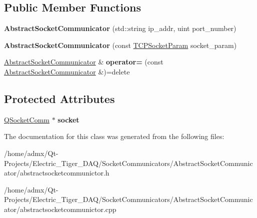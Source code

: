 \subsection*{Public Member Functions}
\begin{DoxyCompactItemize}
\item 
\hypertarget{class_abstract_socket_communicator_a94b6e0b544fadba42bd3a5c6f4a549fd}{{\bfseries Abstract\+Socket\+Communicator} (std\+::string ip\+\_\+addr, uint port\+\_\+number)}\label{class_abstract_socket_communicator_a94b6e0b544fadba42bd3a5c6f4a549fd}

\item 
\hypertarget{class_abstract_socket_communicator_a0d5d09d52f50e951ee7d5710b06a7a9d}{{\bfseries Abstract\+Socket\+Communicator} (const \hyperlink{struct_t_c_p_socket_param}{T\+C\+P\+Socket\+Param} socket\+\_\+param)}\label{class_abstract_socket_communicator_a0d5d09d52f50e951ee7d5710b06a7a9d}

\item 
\hypertarget{class_abstract_socket_communicator_a7ee57a3af5927ac08f515055dbcdc829}{\hyperlink{class_abstract_socket_communicator}{Abstract\+Socket\+Communicator} \& {\bfseries operator=} (const \hyperlink{class_abstract_socket_communicator}{Abstract\+Socket\+Communicator} \&)=delete}\label{class_abstract_socket_communicator_a7ee57a3af5927ac08f515055dbcdc829}

\end{DoxyCompactItemize}
\subsection*{Protected Attributes}
\begin{DoxyCompactItemize}
\item 
\hypertarget{class_abstract_socket_communicator_a7e69037572c26cf596bd117490f9d6c1}{\hyperlink{class_q_socket_comm}{Q\+Socket\+Comm} $\ast$ {\bfseries socket}}\label{class_abstract_socket_communicator_a7e69037572c26cf596bd117490f9d6c1}

\end{DoxyCompactItemize}


The documentation for this class was generated from the following files\+:\begin{DoxyCompactItemize}
\item 
/home/admx/\+Qt-\/\+Projects/\+Electric\+\_\+\+Tiger\+\_\+\+D\+A\+Q/\+Socket\+Communicators/\+Abstract\+Socket\+Communicator/abstractsocketcommunictor.\+h\item 
/home/admx/\+Qt-\/\+Projects/\+Electric\+\_\+\+Tiger\+\_\+\+D\+A\+Q/\+Socket\+Communicators/\+Abstract\+Socket\+Communicator/abstractsocketcommunictor.\+cpp\end{DoxyCompactItemize}
